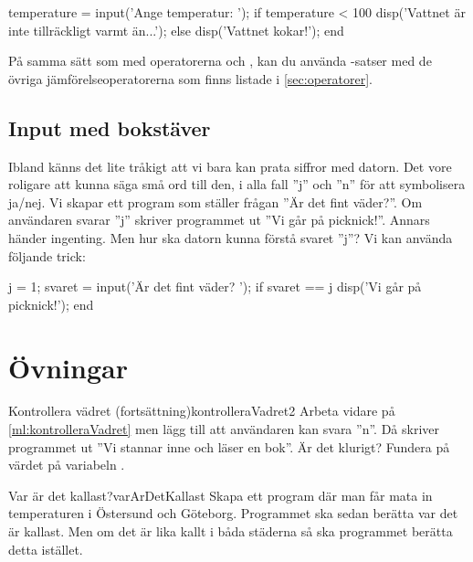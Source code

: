 \begin{matlab}[caption={Mindre än-operatorn},label={}]
temperature = input('Ange temperatur: ');
if temperature < 100
    disp('Vattnet är inte tillräckligt varmt än...');
else
    disp('Vattnet kokar!');
end
\end{matlab}

På samma sätt som med operatorerna \cw{==} och \cw{<}, kan du använda -satser med de övriga jämförelseoperatorerna som finns listade i \autoref{sec:operatorer}.


\subsection{Input med bokstäver}

Ibland känns det lite tråkigt att vi bara kan prata siffror med datorn. Det vore roligare att kunna säga små ord till den, i alla fall ''j'' och ''n'' för att symbolisera ja/nej.
Vi skapar ett program som ställer frågan ''Är det fint väder?''. Om användaren svarar ''j'' skriver programmet ut ''Vi går på picknick!''. Annars händer ingenting. Men hur ska datorn kunna förstå svaret ''j''? Vi kan använda följande trick:

\begin{matlab}[caption={Kontrollera vädret},label={ml:kontrolleraVadret}]
j = 1; %
svaret = input('Är det fint väder? ');
if svaret == j
    disp('Vi går på picknick!');
end
\end{matlab}


\section{Övningar}

\begin{matteovning}{Kontrollera vädret (fortsättning)}{kontrolleraVadret2}
Arbeta vidare på \autoref{ml:kontrolleraVadret} men lägg till att användaren kan svara ''n''. Då skriver programmet ut ''Vi stannar inne och läser en bok''. Är det klurigt? Fundera på värdet på variabeln .
\end{matteovning}


\begin{matteovning}{Var är det kallast?}{varArDetKallast}
Skapa ett program där man får mata in temperaturen i Östersund och Göteborg. Programmet ska sedan berätta var det är kallast. Men om det är lika kallt i båda städerna så ska programmet berätta detta istället.
\end{matteovning}

